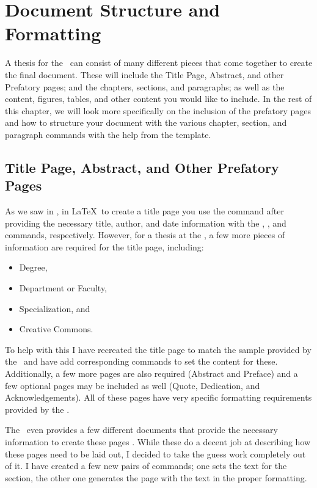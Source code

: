 \chapter{Document Structure and Formatting}\label{ch:documentstructure}
	A thesis for the \University\ can consist of many different pieces that come together to create the final document.
	These will include the Title Page, Abstract, and other Prefatory pages; and the chapters, sections, and paragraphs; as well as the content, figures, tables, and other content you would like to include.
	In the rest of this chapter, we will look more specifically on the inclusion of the prefatory pages and how to structure your document with the various chapter, section, and paragraph commands with the help from the template.
	
	\section{Title Page, Abstract, and Other Prefatory Pages}
		As we saw in , in \LaTeX\ to create a title page you use the  command after providing the necessary title, author, and date information with the \mopt{}, \mopt{}, and \mopt{} commands, respectively.
		However, for a thesis at the \University, a few more pieces of information are required for the title page, including:
		\begin{itemize}
			\item Degree,
			\item Department or Faculty,
			\item Specialization, and 
			\item Creative Commons.
		\end{itemize}
		To help with this I have recreated the title page to match the sample provided by the \Faculty\ and have add corresponding commands to set the content for these.
		Additionally, a few more pages are also required (Abstract and Preface) and a few optional pages may be included as well (Quote, Dedication, and Acknowledgements).
		All of these pages have very specific formatting requirements provided by the \Fac.
		
		The \Faculty\ even provides a few different documents that provide the necessary information to create these pages \cite{FGPS2024}.
		While these do a decent job at describing how these pages need to be laid out, I decided to take the guess work completely out of it. 
		I have created a few new pairs of commands; one sets the text for the section, the other one generates the page with the text in the proper formatting.

